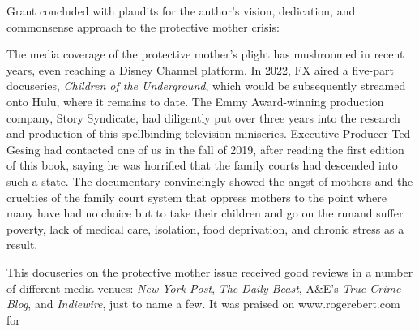 \noindent{}Grant concluded with plaudits for the author's vision, dedication, and
commonsense approach to the protective mother crisis:

\vspace{-.5em}
 \pfl{}


\vspace*{1em}

\noindent{}The media coverage of the protective mother’s plight has mushroomed
in recent years, even reaching a Disney Channel platform. In 2022, FX
aired a five-part docuseries, \textit{Children of the Underground}, which would
be subsequently streamed onto Hulu, where it remains to date. The
Emmy Award-winning production company, Story Syndicate, had diligently 
put over three years into the research and production of this
spellbinding television miniseries. Executive Producer Ted Gesing had
contacted one of us in the fall of 2019, after reading the first edition of
this book, saying he was horrified that the family courts had descended
into such a state. The documentary convincingly showed the angst of
mothers and the cruelties of the family court system that oppress 
mothers to the point where many have had no choice but to take their children
and go on the run\mdash{}and suffer
poverty, lack of medical care, isolation, food deprivation, and chronic
stress as a result. \pfl{}

This docuseries on the protective mother issue received good reviews
in a number of different media venues: \textit{New York Post}, 
\textit{The Daily Beast},
A\&E's \textit{True Crime Blog}, and \textit{Indiewire}, 
just to name a few. It was praised
on www.rogerebert.com for \hspace{1pt} \pfl{}

